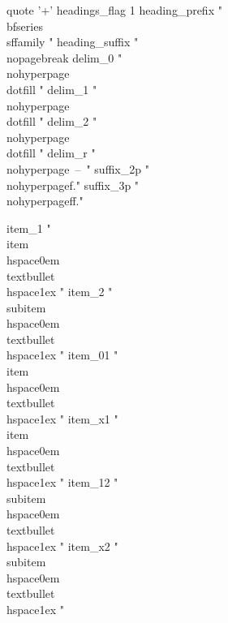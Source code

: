 quote '+' %
headings_flag 1
heading_prefix "{\\bfseries\\sffamily "%
heading_suffix "}\\nopagebreak%
delim_0 "\\nohyperpage{\\dotfill }"
delim_1 "\\nohyperpage{\\dotfill }"
delim_2 "\\nohyperpage{\\dotfill }"
delim_r "\\nohyperpage{~--~}"
suffix_2p "\\nohyperpage{f.}"
suffix_3p "\\nohyperpage{ff.}"



item_1 "\n \\item\\hspace{0em}\\textbullet \\hspace{1ex} "
item_2 "\n \\subitem\\hspace{0em}\\textbullet \\hspace{1ex} "
item_01 "\n \\item\\hspace{0em}\\textbullet \\hspace{1ex} "
item_x1 "\n \\item\\hspace{0em}\\textbullet \\hspace{1ex} "
item_12 "\n \\subitem\\hspace{0em}\\textbullet \\hspace{1ex} "
item_x2 "\n \\subitem\\hspace{0em}\\textbullet \\hspace{1ex} "
